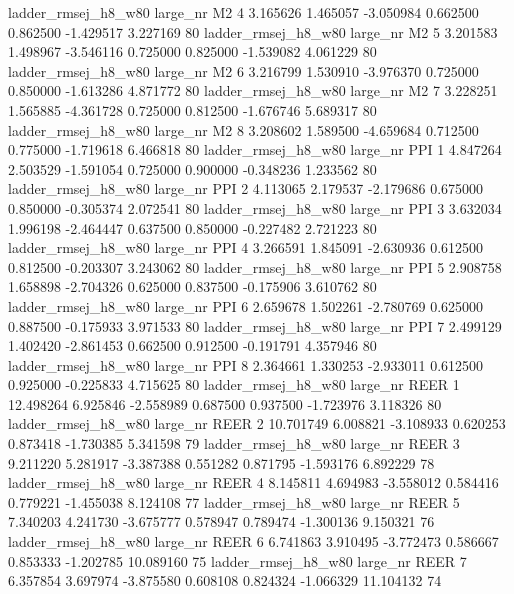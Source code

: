 ladder_rmsej_h8_w80   large_nr       M2                 4  3.165626  1.465057  -3.050984 0.662500 0.862500 -1.429517    3.227169 80
ladder_rmsej_h8_w80   large_nr       M2                 5  3.201583  1.498967  -3.546116 0.725000 0.825000 -1.539082    4.061229 80
ladder_rmsej_h8_w80   large_nr       M2                 6  3.216799  1.530910  -3.976370 0.725000 0.850000 -1.613286    4.871772 80
ladder_rmsej_h8_w80   large_nr       M2                 7  3.228251  1.565885  -4.361728 0.725000 0.812500 -1.676746    5.689317 80
ladder_rmsej_h8_w80   large_nr       M2                 8  3.208602  1.589500  -4.659684 0.712500 0.775000 -1.719618    6.466818 80
ladder_rmsej_h8_w80   large_nr      PPI                 1  4.847264  2.503529  -1.591054 0.725000 0.900000 -0.348236    1.233562 80
ladder_rmsej_h8_w80   large_nr      PPI                 2  4.113065  2.179537  -2.179686 0.675000 0.850000 -0.305374    2.072541 80
ladder_rmsej_h8_w80   large_nr      PPI                 3  3.632034  1.996198  -2.464447 0.637500 0.850000 -0.227482    2.721223 80
ladder_rmsej_h8_w80   large_nr      PPI                 4  3.266591  1.845091  -2.630936 0.612500 0.812500 -0.203307    3.243062 80
ladder_rmsej_h8_w80   large_nr      PPI                 5  2.908758  1.658898  -2.704326 0.625000 0.837500 -0.175906    3.610762 80
ladder_rmsej_h8_w80   large_nr      PPI                 6  2.659678  1.502261  -2.780769 0.625000 0.887500 -0.175933    3.971533 80
ladder_rmsej_h8_w80   large_nr      PPI                 7  2.499129  1.402420  -2.861453 0.662500 0.912500 -0.191791    4.357946 80
ladder_rmsej_h8_w80   large_nr      PPI                 8  2.364661  1.330253  -2.933011 0.612500 0.925000 -0.225833    4.715625 80
ladder_rmsej_h8_w80   large_nr     REER                 1 12.498264  6.925846  -2.558989 0.687500 0.937500 -1.723976    3.118326 80
ladder_rmsej_h8_w80   large_nr     REER                 2 10.701749  6.008821  -3.108933 0.620253 0.873418 -1.730385    5.341598 79
ladder_rmsej_h8_w80   large_nr     REER                 3  9.211220  5.281917  -3.387388 0.551282 0.871795 -1.593176    6.892229 78
ladder_rmsej_h8_w80   large_nr     REER                 4  8.145811  4.694983  -3.558012 0.584416 0.779221 -1.455038    8.124108 77
ladder_rmsej_h8_w80   large_nr     REER                 5  7.340203  4.241730  -3.675777 0.578947 0.789474 -1.300136    9.150321 76
ladder_rmsej_h8_w80   large_nr     REER                 6  6.741863  3.910495  -3.772473 0.586667 0.853333 -1.202785   10.089160 75
ladder_rmsej_h8_w80   large_nr     REER                 7  6.357854  3.697974  -3.875580 0.608108 0.824324 -1.066329   11.104132 74

